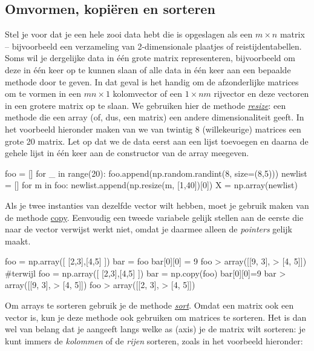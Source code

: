 \subsection{Omvormen, kopiëren en sorteren}
Stel je voor dat je een hele zooi data hebt die is opgeslagen als een $m \times n$ matrix – bijvoorbeeld een verzameling van 2-dimensionale plaatjes of reistijdentabellen. Soms wil je dergelijke data in één grote matrix representeren, bijvoorbeeld om deze in één keer op te kunnen slaan of alle data in één keer aan een bepaalde methode door te geven. In dat geval is het handig om de afzonderlijke matrices om te vormen in een $mn \times 1$ kolomvector of een $1 \times nm$ rijvector en deze vectoren in een grotere matrix op te slaan. We gebruiken hier de methode \textit{\href{https://docs.scipy.org/doc/numpy/reference/generated/numpy.resize.html}{resize}}: een methode die een array (of, dus, een matrix) een andere dimensionaliteit geeft. In het voorbeeld hieronder maken van we van twintig 8  (willekeurige) matrices een grote 20  matrix. Let op dat we de data eerst aan een lijst toevoegen en daarna de gehele lijst in één keer aan de constructor van de array meegeven.

\begin{python}
foo = []
for _ in range(20):
    foo.append(np.random.randint(8, size=(8,5)))
newlist = []
for m in foo:
    newlist.append(np.resize(m, [1,40])[0])
X = np.array(newlist)
\end{python}

Als je twee instanties van dezelfde vector wilt hebben, moet je gebruik maken van de methode \href{https://docs.scipy.org/doc/numpy/reference/generated/numpy.copy.html}{copy}. Eenvoudig een tweede variabele gelijk stellen aan de eerste die naar de vector verwijst werkt niet, omdat je daarmee alleen de \textit{pointers} gelijk maakt.

\begin{python}
foo = np.array([ [2,3],[4,5] ])
bar = foo
bar[0][0] = 9
foo
> array([[9, 3],
>       [4, 5]])
#terwijl
foo = np.array([ [2,3],[4,5] ])
bar = np.copy(foo)
bar[0][0]=9
bar
> array([[9, 3],
>       [4, 5]])
foo
> array([[2, 3],
>       [4, 5]])

\end{python}

Om arrays te sorteren gebruik je de methode \textit{\href{https://docs.scipy.org/doc/numpy/reference/generated/numpy.sort.html}{sort}}. Omdat een matrix ook een vector is, kun je deze methode ook gebruiken om matrices te sorteren. Het is dan wel van belang dat je aangeeft langs welke as (axis) je de matrix wilt sorteren: je kunt immers de \textit{kolommen} of de \textit{rijen} sorteren, zoals in het voorbeeld hieronder: 

